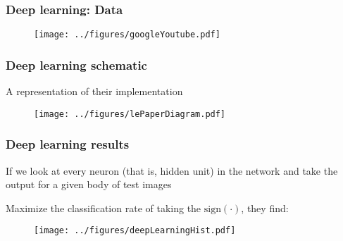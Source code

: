 \documentclass[12pt]{beamer}
\begin{document}
\begin{frame}[fragile]
\frametitle{Deep learning: Data}
\begin{figure}
\centering
\texttt{[image: ../figures/googleYoutube.pdf]}
\end{figure}
\end{frame}
%

\begin{frame}[fragile]
\frametitle{Deep learning schematic}
A representation of their implementation
\begin{figure}
\centering
\texttt{[image: ../figures/lePaperDiagram.pdf]}
\end{figure}
\end{frame}

%
%
%
\begin{frame}[fragile]
\frametitle{Deep learning results}
If we look at every neuron (that is, hidden unit) in the network and take the output for a given body of test images

\vsp
Maximize the classification rate of taking the $\textrm{sign}(\cdot)$, they find:
\begin{figure}
\centering
\texttt{[image: ../figures/deepLearningHist.pdf]}
\end{figure}
\end{frame}
\end{document}
